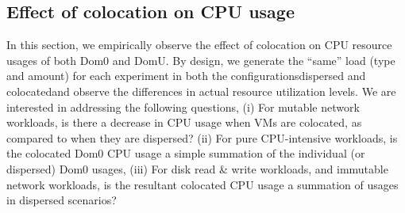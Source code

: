 \subsection{Effect of colocation on CPU usage}
In this section, we empirically observe the effect of colocation
on CPU resource usages of both Dom0 and DomU. 
By design, we generate the ``same'' load (type and 
amount) for each experiment in both the configurations\textemdash{}dispersed and 
colocated\textemdash{}and observe the differences in actual resource utilization
levels. 
We are interested in addressing the following questions,
(i) For mutable network workloads, is there a decrease in CPU usage when
VMs are colocated, as compared to when they are dispersed? 
(ii) For pure CPU-intensive workloads, is the colocated Dom0 CPU usage
a simple summation of the individual (or dispersed) Dom0 usages, (iii) For
disk read \& write workloads, and immutable network workloads, is
the resultant colocated CPU usage a summation of usages in dispersed
scenarios?


